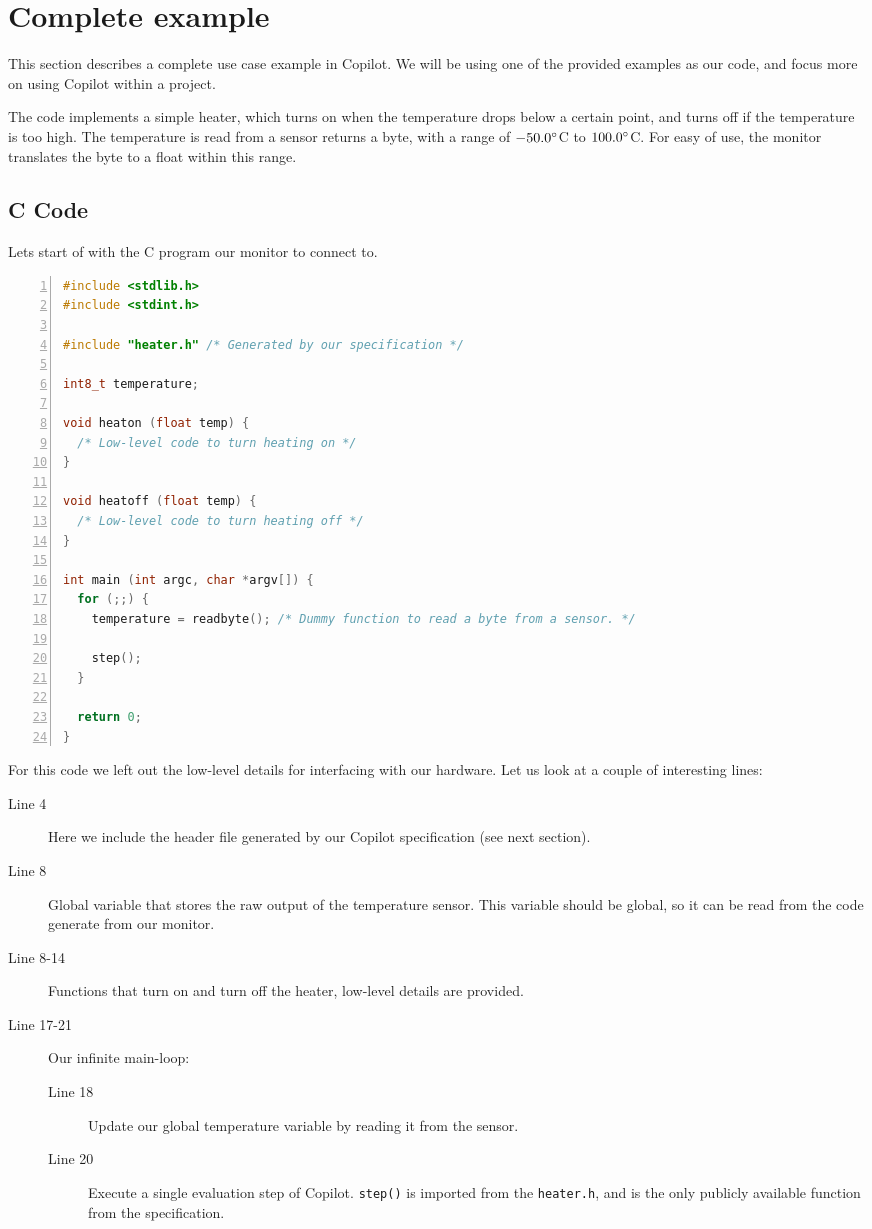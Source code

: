 \section{Complete example}
\label{sec:complete_example}
This section describes a complete use case example in Copilot. We will be using
one of the provided examples as our code, and focus more on using Copilot
within a project.

The code implements a simple heater, which turns on when the temperature drops
below a certain point, and turns off if the temperature is too high. The
temperature is read from a sensor returns a byte, with a range of
$-50.0\degree$C to $100.0\degree$C. For easy of use, the monitor translates the
byte to a float within this range.

\subsection{C Code}
Lets start of with the C program our monitor to connect to.
\begin{lstlisting}[language=c, numbers=left]
#include <stdlib.h>
#include <stdint.h>

#include "heater.h" /* Generated by our specification */

int8_t temperature;

void heaton (float temp) {
  /* Low-level code to turn heating on */
}

void heatoff (float temp) {
  /* Low-level code to turn heating off */
}

int main (int argc, char *argv[]) {
  for (;;) {
    temperature = readbyte(); /* Dummy function to read a byte from a sensor. */

    step();
  }

  return 0;
}
\end{lstlisting}

For this code we left out the low-level details for interfacing with our
hardware. Let us look at a couple of interesting lines:

\begin{description}
  \item[Line 4] Here we include the header file generated by our Copilot
  specification (see next section).
  \item[Line 8] Global variable that stores the raw output of the temperature
  sensor. This variable should be global, so it can be read from the code
  generate from our monitor.
  \item[Line 8-14] Functions that turn on and turn off the
  heater, low-level details are provided.
  \item[Line 17-21] Our infinite main-loop:
    \begin{description}
      \item[Line 18] Update our global temperature variable by reading it from
      the sensor.
      \item[Line 20] Execute a single evaluation step of Copilot.
      \texttt{step()} is imported from the \texttt{heater.h}, and is the only
      publicly available function from the specification.
    \end{description}
\end{description}

